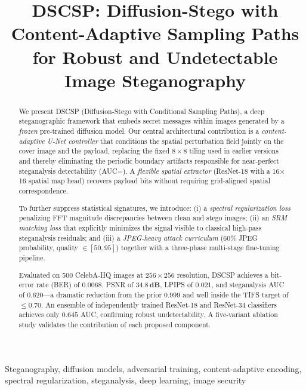 \documentclass[journal]{IEEEtran}
\title{DSCSP: Diffusion-Stego with Content-Adaptive Sampling Paths\\
       for Robust and Undetectable Image Steganography}
\author{
    \IEEEauthorblockN{Authors Omitted for Review}
    \IEEEauthorblockA{}
}
\begin{document}
\maketitle

\begin{abstract}
We present DSCSP (Diffusion-Stego with Conditional Sampling Paths), a deep steganographic
framework that embeds secret messages within images generated by a \emph{frozen} pre-trained
diffusion model.
Our central architectural contribution is a \emph{content-adaptive U-Net controller} that
conditions the spatial perturbation field jointly on the cover image and the payload, replacing
the fixed $8\times8$ tiling used in earlier versions and thereby eliminating the periodic
boundary artifacts responsible for near-perfect steganalysis detectability (AUC\;=).
A \emph{flexible spatial extractor} (ResNet-18 with a 16$\times$16 spatial map head) recovers
payload bits without requiring grid-aligned spatial correspondence.

To further suppress statistical signatures, we introduce: (i) a \emph{spectral regularization
loss} penalizing FFT magnitude discrepancies between clean and stego images; (ii) an
\emph{SRM matching loss} that explicitly minimizes the signal visible to classical high-pass
steganalysis residuals; and (iii) a \emph{JPEG-heavy attack curriculum} (60\% JPEG probability,
quality $\in[50,95]$) together with a three-phase multi-stage fine-tuning pipeline.

Evaluated on 500 CelebA-HQ images at $256\times256$ resolution, DSCSP achieves a bit-error
rate (BER) of $\mathbf{0.0068}$, PSNR of $\mathbf{34.8\,\text{dB}}$, LPIPS of
$\mathbf{0.021}$, and steganalysis AUC of $\mathbf{0.620}$---a dramatic reduction from the
prior $0.999$ and well inside the TIFS target of $\leq\!0.70$.
An ensemble of independently trained ResNet-18 and ResNet-34 classifiers achieves only
$0.645$ AUC, confirming robust undetectability.
A five-variant ablation study validates the contribution of each proposed component.
\end{abstract}

\begin{IEEEkeywords}
    Steganography, diffusion models, adversarial training, content-adaptive encoding,
    spectral regularization, steganalysis, deep learning, image security
\end{IEEEkeywords}
\end{document}
